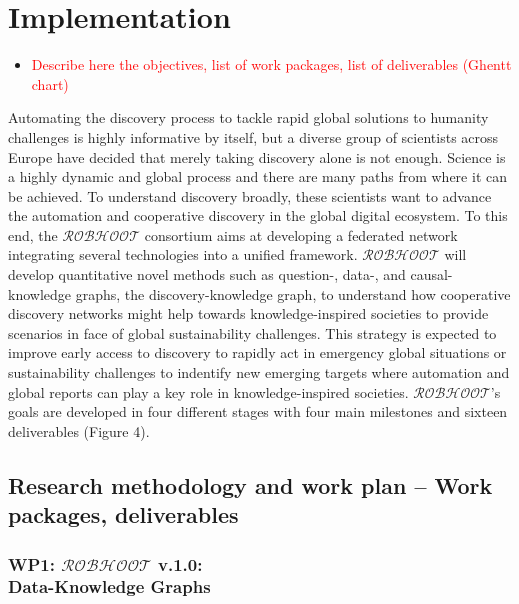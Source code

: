 \documentclass[11pt, a4paper]{article} %
\begin{document}
\section{Implementation}

\begin{itemize}
\item \textcolor{red}{Describe here the objectives, list of work
    packages, list of deliverables (Ghentt chart)}
\end{itemize}
    
Automating the discovery process to tackle rapid global solutions to
humanity challenges is highly informative by itself, but a diverse
group of scientists across Europe have decided that merely taking
discovery alone is not enough. Science is a highly dynamic and global
process and there are many paths from where it can be achieved. To
understand discovery broadly, these scientists want to advance the
automation and cooperative discovery in the global digital
ecosystem. To this end, the $\mathcal{ROBHOOT}$ consortium aims at
developing a federated network integrating several technologies into a
unified framework. $\mathcal{ROBHOOT}$ will develop quantitative novel
methods such as question-, data-, and causal-knowledge graphs, the
discovery-knowledge graph, to understand how cooperative discovery
networks might help towards knowledge-inspired societies to provide
scenarios in face of global sustainability challenges. This strategy
is expected to improve early access to discovery to rapidly act in
emergency global situations or sustainability challenges to indentify
new emerging targets where automation and global reports can play a
key role in knowledge-inspired societies. $\mathcal{ROBHOOT}$'s goals
are developed in four different stages with four main milestones and
sixteen deliverables (Figure 4).

  
\subsection{Research methodology and work plan – Work packages,
  deliverables}


\subsubsection{{\bf WP1: $\mathcal{ROBHOOT}$ v.1.0}: \\ Data-Knowledge Graphs}
\end{document}
